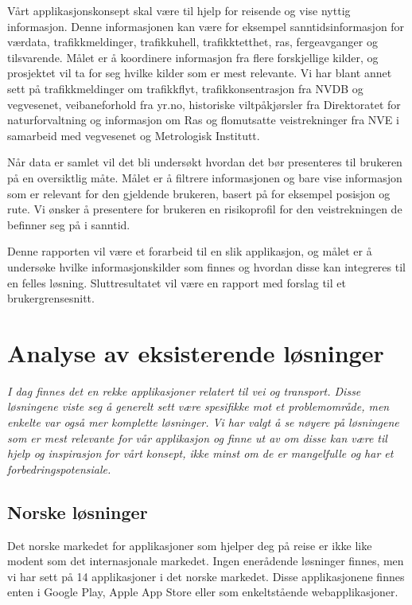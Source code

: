 \documentclass[a4paper,norsk,oneside]{book}
\begin{document}
Vårt applikasjonskonsept skal være til hjelp for reisende og vise nyttig informasjon.  Denne informasjonen kan være for eksempel sanntidsinformasjon for værdata, trafikkmeldinger, trafikkuhell, trafikktetthet, ras, fergeavganger og tilsvarende. Målet er å koordinere informasjon fra flere forskjellige kilder, og prosjektet vil ta for seg hvilke kilder som er mest relevante. Vi har blant annet sett på trafikkmeldinger om trafikkflyt,  trafikkonsentrasjon fra NVDB og vegvesenet, veibaneforhold fra yr.no, historiske viltpåkjørsler fra Direktoratet for naturforvaltning og informasjon om Ras og flomutsatte veistrekninger fra NVE i samarbeid med vegvesenet og Metrologisk Institutt.
	
Når data er samlet vil det bli undersøkt hvordan det bør presenteres til brukeren på en oversiktlig måte. Målet er å filtrere informasjonen og bare vise informasjon som er relevant for den gjeldende brukeren, basert på for eksempel posisjon og rute. Vi ønsker å presentere for brukeren en risikoprofil for den veistrekningen de befinner seg på i sanntid.

Denne rapporten vil være et forarbeid til en slik applikasjon, og målet er å undersøke hvilke informasjonskilder som finnes og hvordan disse kan integreres til en felles løsning. Sluttresultatet vil være en rapport med forslag til et brukergrensesnitt. 

\chapter{ Analyse av eksisterende løsninger}\label{T-B}
\label{cha:TheoryAndBackground}

{\it I dag finnes det en rekke applikasjoner relatert til vei og transport. Disse løsningene viste seg å generelt sett være spesifikke mot et problemområde, men enkelte var også mer komplette løsninger. Vi har valgt å se nøyere på løsningene som er mest relevante for vår applikasjon og finne ut av om disse kan være til hjelp og inspirasjon for vårt konsept, ikke minst om de er mangelfulle og har et forbedringspotensiale.}


\section{Norske løsninger}
\label{sec:no1}

Det norske markedet for applikasjoner som hjelper deg på reise er ikke like modent som det internasjonale markedet. Ingen enerådende løsninger finnes, men vi har sett på 14 applikasjoner i det norske markedet. Disse applikasjonene finnes enten i Google Play, Apple App Store eller som enkeltstående webapplikasjoner.
\end{document}
